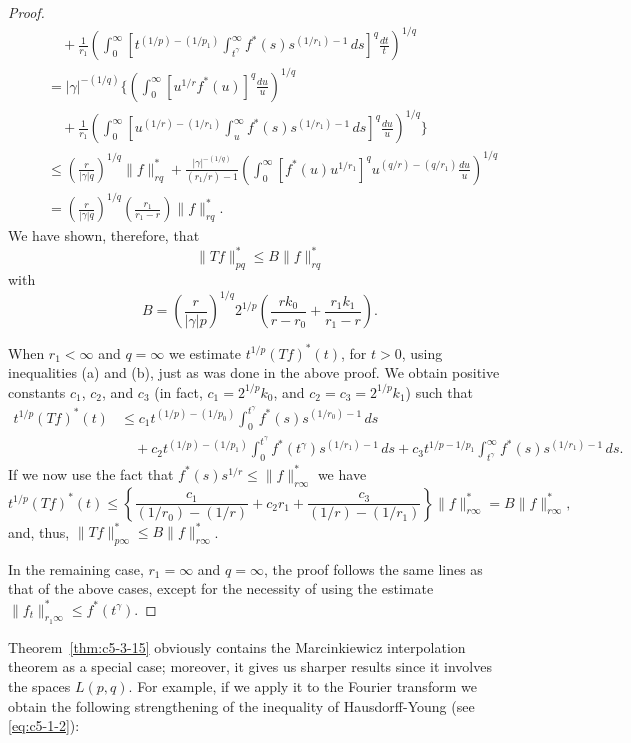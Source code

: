 \begin{proof}
\begin{align*}
&\quad\quad+\frac{1}{r_{1}}\left(\int_{0}^{\infty}\left[t^{(1/p)-(1/p_{1})}\int_{t^{\gamma}}^{\infty}f^{*}(s)s^{(1/r_{1})-1}\,ds\right]^{q}\frac{dt}{t}\right)^{1/q}\\
&\quad=|\gamma|^{-(1/q)}\Biggl\{\left(\int_{0}^{\infty}[u^{1/r}f^{*}(u)]^{q}\frac{du}{u}\right)^{1/q}\\
&\quad\quad+\frac{1}{r_{1}}\left(\int_{0}^{\infty}\left[u^{(1/r)-(1/r_{1})}\int_{u}^{\infty}f^{*}(s)s^{(1/r_{1})-1}\,ds\right]^{q}\frac{du}{u}\right)^{1/q}\Biggr\}\\
&\quad\leq\left(\frac{r}{|\gamma|q}\right)^{1/q}\|f\|_{rq}^{*}
+\frac{|\gamma|^{-(1/q)}}{(r_{1}/r)-1}
\left(\int_{0}^{\infty}[f^{*}(u)u^{1/r_{1}}]^{q}u^{(q/r)-(q/r_{1})}\frac{du}{u}\right)^{1/q}\\
&\quad=\left(\frac{r}{|\gamma|q}\right)^{1/q}\left(\frac{r_{1}}{r_{1}-r}\right)\|f\|_{rq}^{*}.
\end{align*}
We have shown, therefore, that
\[
\|Tf\|_{pq}^{*}\leq B\|f\|_{rq}^{*}
\]
with
\[
B=\left(\frac{r}{|\gamma|p}\right)^{1/q}2^{1/p}
\left(\frac{rk_{0}}{r-r_{0}}+\frac{r_{1}k_{1}}{r_{1}-r}\right).
\]

When $r_{1} < \infty$ and $q = \infty$ we estimate $t^{1/p}(Tf)^{*}(t)$, for
$t > 0$, using inequalities (a) and (b), just as was done in the above proof.
We obtain positive constants $c_{1}$, $c_{2}$, and $c_{3}$ (in fact,
$c_{1} = 2^{1/p}k_{0}$, and $c_{2} = c_{3} = 2^{1/p}k_{1}$) such that
\begin{align*}
t^{1/p}(Tf)^{*}(t)&\leq c_{1}t^{(1/p)-(1/p_{0})}\int_{0}^{t^{\gamma}}f^{*}(s)s^{(1/r_{0})-1}\,ds\\
&\quad+c_{2}t^{(1/p)-(1/p_{1})}\int_{0}^{t^{\gamma}}f^{*}(t^{\gamma})s^{(1/r_{1})-1}\,ds
+c_{3}t^{1/p-1/p_{1}}\int_{t^{\gamma}}^{\infty}f^{*}(s)s^{(1/r_{1})-1}\,ds.
\end{align*}
If we now use the fact that $f^{*}(s)s^{1/r} \leq \|f\|_{r\infty}^{*}$ we have
\[
t^{1/p}(Tf)^{*}(t)\leq\left\{\frac{c_{1}}{(1/r_{0})-(1/r)}+c_{2}r_{1}
+\frac{c_{3}}{(1/r)-(1/r_{1})}\right\}\|f\|_{r\infty}^{*}=B\|f\|_{r\infty}^{*},
\]
and, thus, $\|Tf\|_{p\infty}^{*} \leq B\|f\|_{r\infty}^{*}$.

In the remaining case, $r_{1} = \infty$ and $q = \infty$, the proof follows the
same lines as that of the above cases, except for the necessity of using the
estimate $\|f_{t}\|_{r_{1}\infty}^{*} \leq f^{*}(t^{\gamma})$.
\end{proof}

Theorem~\ref{thm:c5-3-15} obviously contains the Marcinkiewicz interpolation
theorem as a special case; moreover, it gives us sharper results since it
involves the spaces $L(p, q)$. For example, if we apply it to the Fourier
transform we obtain the following strengthening of the inequality of
Hausdorff-Young (see \eqref{eq:c5-1-2}):

